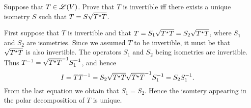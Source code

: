 \begin{exercise}
Suppose that $T \in \mathscr{L}(V)$. Prove that $T$ is invertible iff there exists
a unique isometry $S$ such that $T = S \sqrt{T^{\star} T}$.
\end{exercise}
\begin{solution}
First suppose that $T$ is invertible and that $T = S_1 \sqrt{T^{\star} T} =
S_2 \sqrt{T^{\star} T}$, where $S_1$ and $S_2$ are isometries. Since we assumed $T$
to be invertible, it must be that $\sqrt{T^{\star} T}$ is also invertible. The
operators $S_1$ and $S_2$ being isometries are invertible. Thus
$T^{-1} = \sqrt{T^{\star} T}^{-1} S_1^{-1}$,
and hence
\[
    I = T T^{-1} = S_2 \sqrt{T^{\star} T} \sqrt{T^{\star} T}^{-1} S_1^{-1} = S_2 S_1^{-1}.
\]
From the last equation we obtain that $S_1 = S_2$. Hence the isomtery appearing
in the polar decomposition of $T$ is unique.

\end{solution}
